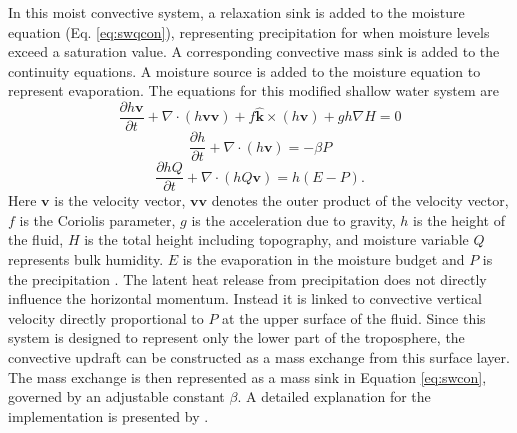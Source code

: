      In this moist convective system, a relaxation sink is added to the moisture equation (Eq. \ref{eq:swqcon}), 
     representing precipitation for when moisture levels exceed a saturation value. 
     A corresponding convective mass sink is added to the continuity equations. A 
     moisture source is added to the moisture equation to represent evaporation. 
     The equations for this modified shallow water system are
   \begin{equation}
     \label{eq:swmom} \frac{\partial h \mathbf{v}}{\partial t} +
     \nabla \cdot ( h \mathbf{v} \mathbf{v}) + f \mathbf{\hat{k}}\times(h\mathbf{v}) + gh\nabla H = 0
   \end{equation}
   \begin{equation}
     \label{eq:swcon}  \frac{\partial h}{\partial t} + \nabla \cdot (h\mathbf{v}) = - \beta P 
   \end{equation}
   \begin{equation}
     \label{eq:swqcon}  \frac{\partial hQ}{\partial t} + \nabla \cdot (hQ\mathbf{v}) = h(E - P).
   \end{equation}
   Here $\mathbf{v}$ is the velocity vector, $\mathbf{v}\mathbf{v}$ denotes the outer product
   of the velocity vector, $f$ is the Coriolis parameter, $g$ is 
   the acceleration due to gravity,
   $h$ is the height of the fluid, $H$ is the total height including topography, and 
   moisture variable $Q$ represents bulk humidity. 
   $E$ is the evaporation in the moisture budget and $P$ is the precipitation . 
   The latent heat release from precipitation does not directly influence the 
   horizontal momentum. Instead it is linked to convective vertical velocity 
   directly proportional to $P$ at the upper surface of the fluid.
   Since this system is designed to represent only the lower part of the 
   troposphere, the convective updraft can be constructed as a mass exchange 
   from this surface layer. The mass exchange is then represented as a mass 
   sink in Equation \ref{eq:swcon}, governed by an adjustable
   constant $\beta$.  A detailed explanation for the implementation is 
   presented by \cite{bouchut2009fronts}.

